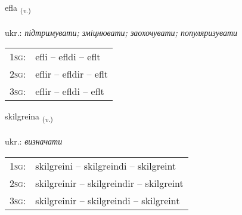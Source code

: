 \documentclass[frontgrid, backgrid]{flacards}\usepackage[]{graphicx}\usepackage[]{xcolor}
\begin{document}
\renewcommand{\flhead}{\vskip5pt \fboxsep=0pt {\small\bfseries\footnotesize Sagnorð | дієслово}}
\renewcommand{\fcfoot}{\vskip5pt \fboxsep=0pt \hspace{2pt}{\small\bfseries\footnotesize 1K}}

\renewcommand{\blhead}{\vskip5pt {\small\bfseries\footnotesize Sagnorð | дієслово }}
\renewcommand{\bcfoot}{\vskip5pt \hspace{2pt}{\small\bfseries\footnotesize 1K}}


{efla \small{\textsubscript{(\textit{v.})}} \\[1ex] %
\textphonetic{[ɛpla]} \\
ukr.: \emph{підтримувати; зміцнювати; заохочувати; популяризувати} \\  [2ex]
\renewcommand*{\arraystretch}{0.8}
\begin{tabular}{p{1cm}l}
\textsc{1sg}: & efli -- efldi -- eflt \\ 
\textsc{2sg}: & eflir -- efldir -- eflt \\ 
\textsc{3sg}: & eflir -- efldi -- eflt \\ 
\end{tabular}
}

\renewcommand{\flhead}{\vskip5pt \fboxsep=0pt {\small\bfseries\footnotesize Sagnorð | дієслово}}
\renewcommand{\fcfoot}{\vskip5pt \fboxsep=0pt \hspace{2pt}{\small\bfseries\footnotesize 1K}}

\renewcommand{\blhead}{\vskip5pt {\small\bfseries\footnotesize Sagnorð | дієслово }}
\renewcommand{\bcfoot}{\vskip5pt \hspace{2pt}{\small\bfseries\footnotesize 1K}}


{skilgreina \small{\textsubscript{(\textit{v.})}} \\[1ex] %
\textphonetic{[scɪlkreina]} \\
ukr.: \emph{визначати} \\  [2ex]
\renewcommand*{\arraystretch}{0.8}
\begin{tabular}{p{1cm}l}
\textsc{1sg}: & skilgreini -- skilgreindi -- skilgreint \\ 
\textsc{2sg}: & skilgreinir -- skilgreindir -- skilgreint \\ 
\textsc{3sg}: & skilgreinir -- skilgreindi -- skilgreint \\ 
\end{tabular}
}
\end{document}

